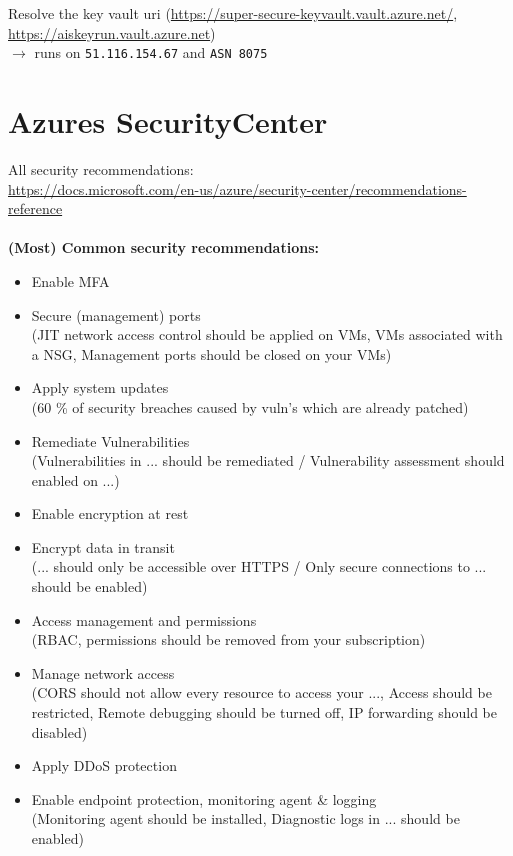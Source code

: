 \documentclass[12pt]{article}
\begin{document}
Resolve the key vault uri (\url{https://super-secure-keyvault.vault.azure.net/}, \url{https://aiskeyrun.vault.azure.net}) \\
$\rightarrow$ runs on \verb|51.116.154.67| and \verb|ASN 8075|


\section*{Azures SecurityCenter}
All security recommendations:\\  \url{https://docs.microsoft.com/en-us/azure/security-center/recommendations-reference} \\ \\
\textbf{(Most) Common security recommendations:}
\begin{itemize}
    \item Enable MFA
    \item Secure (management) ports \\ 
    (JIT network access control should be applied on VMs, VMs associated with a NSG, Management ports should be closed on your VMs)
    \item Apply system updates \\
    (60 \% of security breaches caused by vuln's which are already patched)
    \item Remediate Vulnerabilities \\
    (Vulnerabilities in ... should be remediated / Vulnerability assessment should enabled on ...)
    \item Enable encryption at rest
    \item Encrypt data in transit \\
    (... should only be accessible over HTTPS / Only secure connections to ... should be enabled)
    \item Access management and permissions \\
    (RBAC, permissions should be removed from your subscription)
    \item Manage network access \\
    (CORS should not allow every resource to access your ..., Access should be restricted, Remote debugging should be turned off, IP forwarding should be disabled)
    \item Apply DDoS protection
    \item Enable endpoint protection, monitoring agent \& logging \\
    (Monitoring agent should be installed, Diagnostic logs in ... should be enabled)
\end{itemize}
\end{document}
